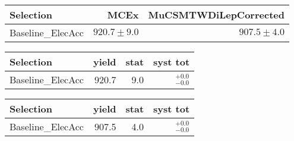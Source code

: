 




\begin{tabular}{lrr}
\toprule
                Selection  &                   MCEx  &          MuCSMTWDiLepCorrected  \\ 
\midrule
        Baseline\_ElecAcc &           $920.7\pm9.0$&                   $907.5\pm4.0$ \\ 
\bottomrule 
\end{tabular}









\begin{tabular}{l|rrr}
\toprule
           Selection & yield & stat & syst tot   \\ 
\midrule
   Baseline\_ElecAcc & 920.7 & 9.0 & ${}^{+0.0}_{-0.0}$ \\
\bottomrule
\end{tabular}



\begin{tabular}{l|rrr}
\toprule
           Selection & yield & stat & syst tot   \\ 
\midrule
   Baseline\_ElecAcc & 907.5 & 4.0 & ${}^{+0.0}_{-0.0}$ \\
\bottomrule
\end{tabular}
